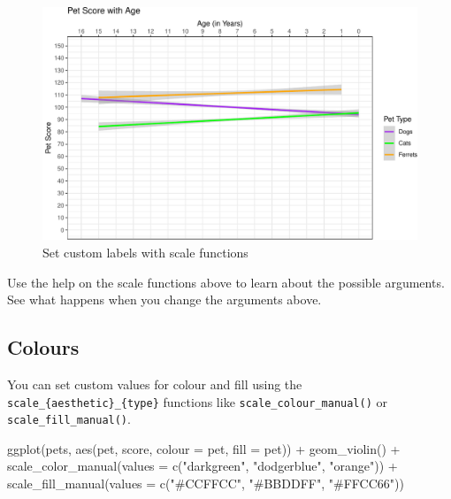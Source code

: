 \documentclass[
  oneside]{book}
\newenvironment{Shaded}{\begin{snugshade}}{\end{snugshade}}
\newcommand{\AttributeTok}[1]{\textcolor[rgb]{0.77,0.63,0.00}{#1}}
\newcommand{\FunctionTok}[1]{\textcolor[rgb]{0.00,0.00,0.00}{#1}}
\newcommand{\NormalTok}[1]{#1}
\newcommand{\SpecialCharTok}[1]{\textcolor[rgb]{0.00,0.00,0.00}{#1}}
\newcommand{\StringTok}[1]{\textcolor[rgb]{0.31,0.60,0.02}{#1}}
\begin{document}
\begin{figure}

{\centering \includegraphics[width=0.9\linewidth]{images/line-labels3-1} 

}

\caption{Set custom labels with scale functions}\label{fig:line-labels3}
\end{figure}

\begin{try}
Use the help on the scale functions above to learn about the possible arguments. See what happens when you change the arguments above.

\end{try}

\hypertarget{custom-colours}{%
\subsection{Colours}\label{custom-colours}}

You can set custom values for colour and fill using the \texttt{scale\_\{aesthetic\}\_\{type\}} functions like \texttt{scale\_colour\_manual()} or \texttt{scale\_fill\_manual()}.

\begin{Shaded}
\begin{Highlighting}[]
\FunctionTok{ggplot}\NormalTok{(pets, }\FunctionTok{aes}\NormalTok{(pet, score, }\AttributeTok{colour =}\NormalTok{ pet, }\AttributeTok{fill =}\NormalTok{ pet)) }\SpecialCharTok{+}
  \FunctionTok{geom\_violin}\NormalTok{() }\SpecialCharTok{+}
  \FunctionTok{scale\_color\_manual}\NormalTok{(}\AttributeTok{values =} \FunctionTok{c}\NormalTok{(}\StringTok{"darkgreen"}\NormalTok{, }\StringTok{"dodgerblue"}\NormalTok{, }\StringTok{"orange"}\NormalTok{)) }\SpecialCharTok{+}
  \FunctionTok{scale\_fill\_manual}\NormalTok{(}\AttributeTok{values =} \FunctionTok{c}\NormalTok{(}\StringTok{"\#CCFFCC"}\NormalTok{, }\StringTok{"\#BBDDFF"}\NormalTok{, }\StringTok{"\#FFCC66"}\NormalTok{))}
\end{Highlighting}
\end{Shaded}
\end{document}
